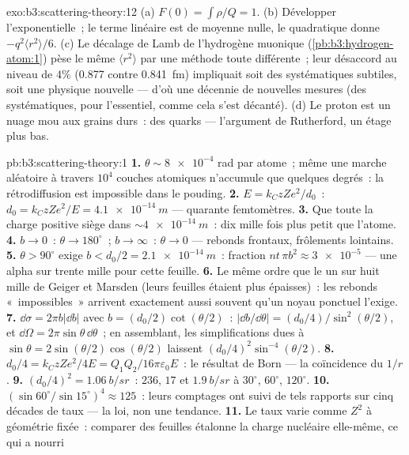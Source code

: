 \begin{solution}{exo:b3:scattering-theory:12}
(a) $F(0) = \int\rho/Q = 1$. (b) Développer l'exponentielle~; le
terme linéaire est de moyenne nulle, le quadratique donne
$-q^2\langle r^2\rangle/6$. (c) Le décalage de Lamb de l'hydrogène
muonique (\cref{pb:b3:hydrogen-atom:1}) pèse le même
$\langle r^2\rangle$ par une méthode toute différente~; leur
désaccord au niveau de $4\%$ (0.877 contre \qty{0.841}{fm})
impliquait soit des systématiques subtiles, soit une physique
nouvelle --- d'où une décennie de nouvelles mesures (des
systématiques, pour l'essentiel, comme cela s'est décanté).
(d) Le proton est un nuage mou aux grains durs~: des quarks ---
l'argument de Rutherford, un étage plus bas.
\end{solution}

\begin{solution}{pb:b3:scattering-theory:1}
\textbf{1.} $\theta \sim \num{8e-4}$ rad par atome~; même une marche
aléatoire à travers $10^4$ couches atomiques n'accumule que quelques
degrés~: la rétrodiffusion est impossible dans le pouding.
\textbf{2.} $E = k_CzZe^2/d_0$~: $d_0 = k_CzZe^2/E =
\qty{4.1e-14}{m}$ --- quarante femtomètres.
\textbf{3.} Que toute la charge positive siège dans
$\sim\qty{4e-14}{m}$~: dix mille fois plus petit que l'atome.
\textbf{4.} $b \to 0$~: $\theta \to 180^\circ$~; $b \to \infty$~:
$\theta \to 0$ --- rebonds frontaux, frôlements lointains.
\textbf{5.} $\theta > 90^\circ$ exige $b < d_0/2 =
\qty{2.1e-14}{m}$~: fraction $nt\,\pi b^2 \approx \num{3e-5}$ ---
une alpha sur trente mille pour cette feuille.
\textbf{6.} Le même ordre que le un sur huit mille de Geiger et
Marsden (leurs feuilles étaient plus épaisses)~: les rebonds
«~impossibles~» arrivent exactement aussi souvent qu'un noyau
ponctuel l'exige.
\textbf{7.} $\dd\sigma = 2\pi b|\dd b|$ avec $b =
(d_0/2)\cot(\theta/2)$~: $|\dd b/\dd\theta| = (d_0/4)/\sin^2(
\theta/2)$, et $\dd\Omega = 2\pi\sin\theta\,\dd\theta$~; en
assemblant, les simplifications dues à
$\sin\theta = 2\sin(\theta/2)\cos(\theta/2)$ laissent
$(d_0/4)^2\sin^{-4}(\theta/2)$.
\textbf{8.} $d_0/4 = k_CzZe^2/4E = Q_1Q_2/16\pi\varepsilon_0E$~:
le résultat de Born --- la coïncidence du $1/r$.
\textbf{9.} $(d_0/4)^2 = \qty{1.06}{b/sr}$~: $236$, $17$ et
$\qty{1.9}{b/sr}$ à $30^\circ$, $60^\circ$, $120^\circ$.
\textbf{10.} $(\sin60^\circ/\sin15^\circ)^4 \approx 125$~: leurs
comptages ont suivi de tels rapports sur cinq décades de taux --- la
loi, non une tendance.
\textbf{11.} Le taux varie comme $Z^2$ à géométrie fixée~: comparer
des feuilles étalonne la charge nucléaire elle-même, ce qui a nourri

\end{solution}
